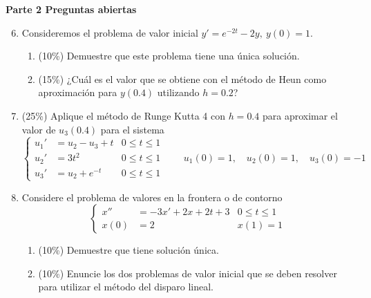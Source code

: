 \documentclass[11pt]{article}
\begin{document}
\vspace{10pt}
\noindent\textbf{Parte 2 Preguntas abiertas}

\begin{enumerate}
\setcounter{enumi}{5}
\item{} Consideremos el problema de valor inicial $y'=e^{-2t}-2y,\ y(0)=1$.
\begin{enumerate}
\item{} (10\%) Demuestre que este problema tiene una única solución.

\vspace{3cm}

\item{} (15\%) ¿Cuál es el valor que se obtiene con el método de Heun como aproximación para $y(0.4)$ utilizando $h=0.2$?

\vspace{4cm}
\end{enumerate}

\item{} (25\%) Aplique el método de Runge Kutta 4 con $h=0.4$ para aproximar el valor de $u_3(0.4)$ para el sistema
\[
\left\{
\begin{aligned}
u_1' &= u_2-u_3+t & 0\leq t\leq 1\\
u_2' &= 3t^2 & 0\leq t\leq 1\\
u_3' &= u_2+e^{-t} & 0\leq t\leq 1
\end{aligned}
\right.
\qquad u_1(0)=1,\quad u_2(0)=1,\quad u_3(0)=-1
\]

\vspace{6cm}

\item{} Considere el problema de valores en la frontera o de contorno
\[
\left\{
\begin{aligned}
x'' &= -3x'+2x+2t+3 & 0\leq t\leq 1\\
x(0) &= 2 & x(1)=1
\end{aligned}
\right.
\]
\begin{enumerate}
\item{} (10\%) Demuestre que tiene solución única.

\vspace{4cm}

\item{} (10\%) Enuncie los dos problemas de valor inicial que se deben resolver para utilizar el método del disparo lineal.

\vspace{4cm}
\end{enumerate}
\end{enumerate}

\examfooter
\end{document}
